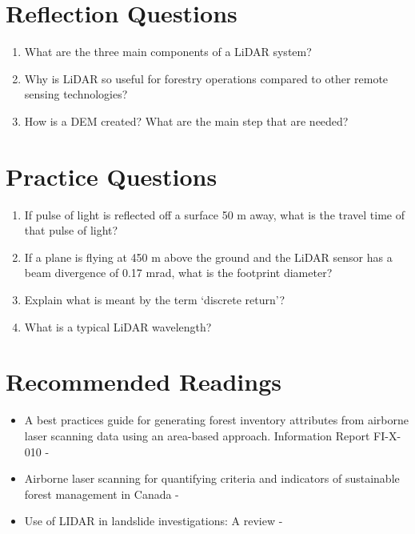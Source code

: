 \documentclass[
]{book}
\providecommand{\tightlist}{%
  \setlength{\itemsep}{0pt}\setlength{\parskip}{0pt}}
\begin{document}
\hypertarget{reflection-questions-11}{%
\section*{Reflection Questions}\label{reflection-questions-11}}

\begin{enumerate}
\def\labelenumi{\arabic{enumi}.}
\tightlist
\item
  What are the three main components of a LiDAR system?
\item
  Why is LiDAR so useful for forestry operations compared to other remote sensing technologies?
\item
  How is a DEM created? What are the main step that are needed?
\end{enumerate}

\hypertarget{practice-questions-8}{%
\section*{Practice Questions}\label{practice-questions-8}}

\begin{enumerate}
\def\labelenumi{\arabic{enumi}.}
\tightlist
\item
  If pulse of light is reflected off a surface 50 m away, what is the travel time of that pulse of light?
\item
  If a plane is flying at 450 m above the ground and the LiDAR sensor has a beam divergence of 0.17 mrad, what is the footprint diameter?
\item
  Explain what is meant by the term `discrete return'?
\item
  What is a typical LiDAR wavelength?
\end{enumerate}

\hypertarget{recommended-readings-5}{%
\section*{Recommended Readings}\label{recommended-readings-5}}

\begin{itemize}
\tightlist
\item
  A best practices guide for generating forest inventory attributes from airborne laser scanning data using an area-based approach. Information Report FI-X-010 - \citet{White2013}
\item
  Airborne laser scanning for quantifying criteria and indicators of sustainable forest management in Canada - \citet{Goodbody2021}
\item
  Use of LIDAR in landslide investigations: A review - \citet{Jaboyedoff2012}
\end{itemize}
\end{document}
